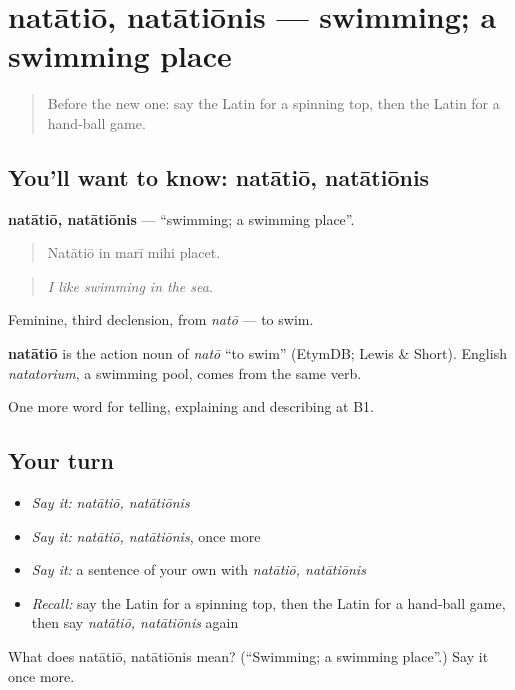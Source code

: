 \section[natātiō, natātiōnis]{natātiō, natātiōnis — swimming; a swimming place}

\label{lesson:LA-C540-natatio}



\begin{quote}
Before the new one: say the Latin for a spinning top, then the Latin for a hand-ball game.
\end{quote}

\subsection*{You'll want to know: natātiō, natātiōnis}
\textbf{natātiō, natātiōnis} — \textquotedblleft{}swimming; a swimming place\textquotedblright{}.

\begin{quote}
Natātiō in marī mihi placet.
\end{quote}

\begin{quote}
\emph{I like swimming in the sea.}
\end{quote}

Feminine, third declension, from \emph{natō} — to swim.

\begin{cousinweb}
\textbf{natātiō} is the action noun of \emph{natō} \textquotedblleft{}to swim\textquotedblright{} (EtymDB; Lewis \& Short). English \emph{natatorium}, a swimming pool, comes from the same verb.
\end{cousinweb}

\begin{grammarlens}[title={What you've built}]
One more word for telling, explaining and describing at B1.
\end{grammarlens}

\subsection*{Your turn}
\begin{itemize}
\raggedright
  \item \emph{Say it:} \emph{natātiō, natātiōnis}
  \item \emph{Say it:} \emph{natātiō, natātiōnis}, once more
  \item \emph{Say it:} a sentence of your own with \emph{natātiō, natātiōnis}
  \item \emph{Recall:} say the Latin for a spinning top, then the Latin for a hand-ball game, then say \emph{natātiō, natātiōnis} again
\end{itemize}

\begin{tcolorbox}[breakable,colback=teal!4,colframe=teal!35!black,title={Before you move on}]
What does natātiō, natātiōnis mean? (\textquotedblleft{}Swimming; a swimming place\textquotedblright{}.) Say it once more.
\end{tcolorbox}
